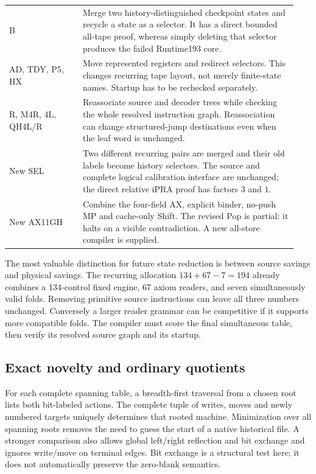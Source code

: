 \documentclass[10pt,letterpaper]{article}
\begin{document}
\begin{longtable}{@{}p{0.24\linewidth}p{0.70\linewidth}@{}}
B&Merge two history-distinguished checkpoint states and recycle a state as a selector. It has a direct bounded all-tape proof, whereas simply deleting that selector produces the failed Runtime193 core.\\[4pt]
AD, TDY, P5, HX&Move represented registers and redirect selectors. This changes recurring tape layout, not merely finite-state names. Startup has to be rechecked separately.\\[4pt]
R, M4R, 4L, QH4L/R&Reassociate source and decoder trees while checking the whole resolved instruction graph. Reassociation can change structured-jump destinations even when the leaf word is unchanged.\\[4pt]
New SEL&Two different recurring pairs are merged and their old labels become history selectors. The source and complete logical calibration interface are unchanged; the direct relative iPRA proof has factors $3$ and $1$.\\[4pt]
New AX11GH&Combine the four-field AX, explicit binder, no-push MP and cache-only Shift. The revised Pop is partial: it halts on a visible contradiction. A new all-store compiler is supplied.\\
\bottomrule\end{longtable}

The most valuable distinction for future state reduction is between
source savings and physical savings. The recurring allocation
$134+67-7=194$ already combines a 134-control fixed engine, 67 axiom
readers, and seven simultaneously valid folds. Removing primitive source
instructions can leave all three numbers unchanged. Conversely a larger
reader grammar can be competitive if it supports more compatible folds.
The compiler must score the final simultaneous table, then verify its
resolved source graph and its startup.

\subsection{Exact novelty and ordinary quotients}

For each complete spanning table, a breadth-first traversal from a chosen
root lists both bit-labeled actions. The complete tuple of writes, moves
and newly numbered targets uniquely determines that rooted machine.
Minimization over all spanning roots removes the need to guess the start
of a native historical file. A stronger comparison also allows global
left/right reflection and bit exchange and ignores write/move on terminal
edges. Bit exchange is a structural test here; it does not automatically
preserve the zero-blank semantics.
\end{document}
